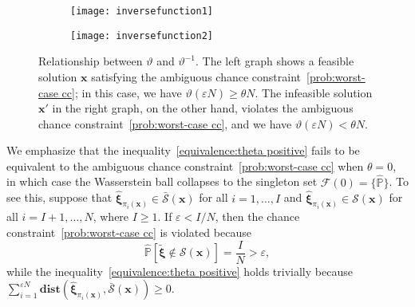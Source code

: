 \documentclass[nonblindrev]{informs2017}
\newcommand{\bmt}[1]{\tilde{\bm{#1}}}
\newcommand{\bmh}[1]{\hat{\bm{#1}}}
\newcommand{\1}[1]{\mathds{1}{\left(#1\right)}}
\begin{document}
\begin{figure}[tb]
\begin{subfigure}{.5\textwidth}
\begin{center}
\texttt{[image: inversefunction1]}
\end{center}
\end{subfigure}%
\begin{subfigure}{.5\textwidth}
\begin{center}
\texttt{[image: inversefunction2]}
\end{center}
\end{subfigure}
\vspace{0.2cm}
\caption{{\textnormal{Relationship between $\vartheta$ and $\vartheta^{-1}$. The left graph shows a feasible solution $\bm{x}$ satisfying the ambiguous chance constraint~\eqref{prob:worst-case cc}; in this case, we have $\vartheta (\varepsilon N) \geq \theta N$. The infeasible solution $\bm{x}'$ in the right graph, on the other hand, violates the ambiguous chance constraint~\eqref{prob:worst-case cc}, and we have $\vartheta (\varepsilon N) < \theta N$.}} \label{fig:inverse_function}}
\end{figure}

\begin{remark}
We emphasize that the inequality~\eqref{equivalence:theta positive} fails to be equivalent to the ambiguous chance constraint~\eqref{prob:worst-case cc} when $\theta = 0$, in which case the Wasserstein ball collapses to the singleton set $\mathcal{F}(0) = \{\hat{\mathbb{P}}\}$. To see this, suppose that $\bmh{\xi}_{\pi_i(\bm{x})} \in \bar{\mathcal{S}}(\bm{x})$ for all $i=1,\ldots,I$ and $\bmh{\xi}_{\pi_i(\bm{x})} \in \mathcal{S}(\bm{x})$ for all $i=I+1,\ldots,N$, where $I\ge 1$. If $\varepsilon < I/N$, then the chance constraint~\eqref{prob:worst-case cc} is violated because
\begin{equation*}
\hat{\mathbb{P}}[\bmt{\xi} \notin \mathcal{S}(\bm{x})] = \frac{I}{N}>\varepsilon,
\end{equation*}
while the inequality~\eqref{equivalence:theta positive} holds trivially because $\sum_{i = 1}^{\varepsilon N} \mathbf{dist}(\bmh{\xi}_{\pi_i(\bm{x})}, \bar{\mathcal{S}}(\bm{x})) \ge 0$.
\end{remark}
\end{document}
